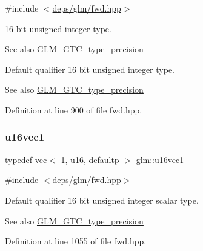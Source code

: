 {\ttfamily \#include $<$\hyperlink{fwd_8hpp}{deps/glm/fwd.\+hpp}$>$}

16 bit unsigned integer type. \begin{DoxySeeAlso}{See also}
\hyperlink{group__gtc__type__precision}{G\+L\+M\+\_\+\+G\+T\+C\+\_\+type\+\_\+precision}
\end{DoxySeeAlso}
Default qualifier 16 bit unsigned integer type. \begin{DoxySeeAlso}{See also}
\hyperlink{group__gtc__type__precision}{G\+L\+M\+\_\+\+G\+T\+C\+\_\+type\+\_\+precision} 
\end{DoxySeeAlso}


Definition at line 900 of file fwd.\+hpp.

\mbox{\label{group__gtc__type__precision_ga40d9e5ab8120f10efcfd7c88436c4a81}} 
\subsubsection{\texorpdfstring{u16vec1}{u16vec1}}
{\footnotesize\ttfamily typedef \hyperlink{structglm_1_1vec}{vec}$<$ 1, \hyperlink{group__gtc__type__precision_gae7a1571503f83d2264ddfa705a6b082a}{u16}, defaultp $>$ \hyperlink{group__gtc__type__precision_ga40d9e5ab8120f10efcfd7c88436c4a81}{glm\+::u16vec1}}



{\ttfamily \#include $<$\hyperlink{fwd_8hpp}{deps/glm/fwd.\+hpp}$>$}

Default qualifier 16 bit unsigned integer scalar type. \begin{DoxySeeAlso}{See also}
\hyperlink{group__gtc__type__precision}{G\+L\+M\+\_\+\+G\+T\+C\+\_\+type\+\_\+precision} 
\end{DoxySeeAlso}


Definition at line 1055 of file fwd.\+hpp.

\mbox{\label{group__gtc__type__precision_ga50bd2ceeb100a187e7c46f135269a0ec}} 
